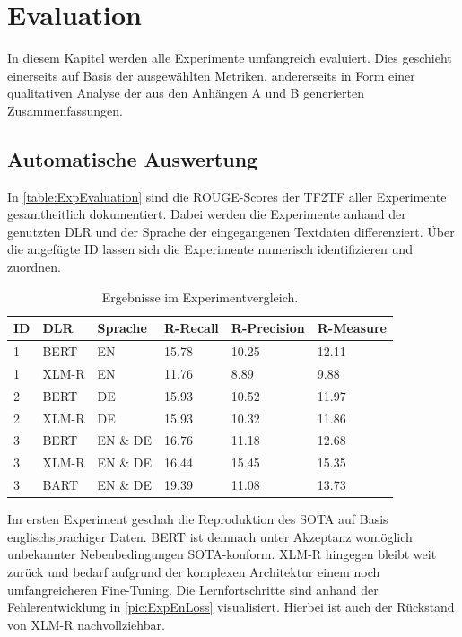 \chapter{Evaluation}
\thispagestyle{fancy}
\label{chap:Evaluation}

\noindent
In diesem Kapitel werden alle Experimente umfangreich evaluiert. Dies geschieht einerseits auf Basis der ausgewählten Metriken, andererseits in Form einer qualitativen Analyse der aus den Anhängen A und B generierten Zusammenfassungen.


\section{Automatische Auswertung}
\noindent
In \autoref{table:ExpEvaluation} sind die \ac{ROUGE}-Scores der \ac{TF2TF} aller Experimente gesamtheitlich dokumentiert. Dabei werden die Experimente anhand der genutzten \ac{DLR} und der Sprache der eingegangenen Textdaten differenziert. Über die angefügte ID lassen sich die Experimente numerisch identifizieren und zuordnen.\\

\begin{table}[htb]
\centering
\begin{tabular}{ | p{1cm} | p{2.5cm} | p{2.5cm} | p{2.5cm} | p{2.5cm} | p{2.5cm} | }
\hline
\textbf{ID} & \textbf{DLR} & \textbf{Sprache} & \textbf{R-Recall} & \textbf{R-Precision} & \textbf{R-Measure} \\
\hline
1 & BERT & EN & 15.78 & 10.25 & 12.11 \\
\hline
1 & XLM-R & EN & 11.76 & 8.89 & 9.88 \\
\hline
2 & BERT & DE & 15.93 & 10.52 & 11.97 \\
\hline
2 & XLM-R & DE & 15.93 & 10.32 & 11.86 \\
\hline
3 & BERT & EN \& DE & 16.76 & 11.18 & 12.68 \\
\hline
3 & XLM-R & EN \& DE & 16.44 & 15.45 & 15.35 \\
\hline
3 & BART & EN \& DE & 19.39 & 11.08 & 13.73 \\
\hline
\end{tabular}
\caption{Ergebnisse im Experimentvergleich.}
\label{table:ExpEvaluation}
\end{table}

\noindent
Im ersten Experiment geschah die Reproduktion des \ac{SOTA} auf Basis englischsprachiger Daten. \ac{BERT} ist demnach unter Akzeptanz womöglich unbekannter Nebenbedingungen \ac{SOTA}-konform. \ac{XLM-R} hingegen bleibt weit zurück und bedarf aufgrund der komplexen Architektur einem noch umfangreicheren Fine-Tuning. Die Lernfortschritte sind anhand der Fehlerentwicklung in \autoref{pic:ExpEnLoss} visualisiert. Hierbei ist auch der Rückstand von \ac{XLM-R} nachvollziehbar.\\


